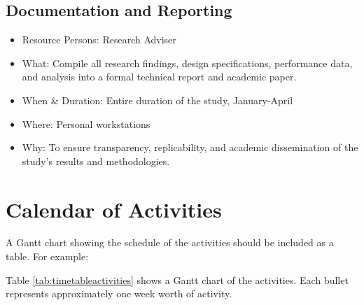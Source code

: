 \subsection{Documentation and Reporting}
\begin{itemize}
	\item Resource Persons: Research Adviser
	\item What: Compile all research findings, design specifications, performance data, and analysis into a formal technical report and academic paper.
	\item When & Duration: Entire duration of the study, January-April
	\item Where: Personal workstations
	\item Why: To ensure transparency, replicability, and academic dissemination of the study’s results and methodologies.
\end{itemize}

\section{Calendar of Activities}

A Gantt chart showing the schedule of the activities should be included as a table. For example:

Table \ref{tab:timetableactivities} shows a Gantt chart of the activities.  Each bullet represents approximately
one week worth of activity.

%
%
\newcommand{\weekone}{\textbullet}
\newcommand{\weektwo}{\textbullet \textbullet}
\newcommand{\weekthree}{\textbullet \textbullet \textbullet}
\newcommand{\weekfour}{\textbullet \textbullet \textbullet \textbullet}

%
%
\begin{comment}
   \newcommand{\weekone}{$\star$}
   \newcommand{\weektwo}{$\star \star$}
   \newcommand{\weekthree}{$\star \star \star$}
   \newcommand{\weekfour}{$\star \star \star \star$ }
\end{comment}



